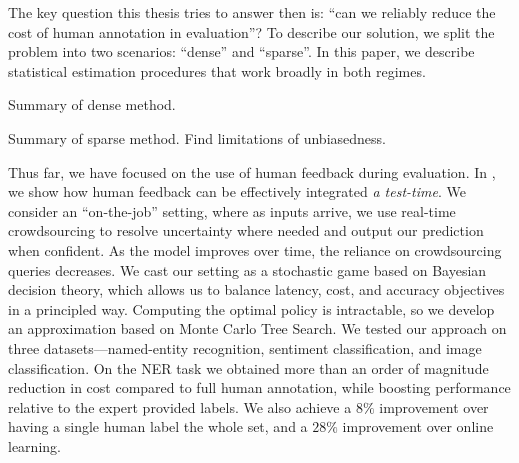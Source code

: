 The key question this thesis tries to answer then is: ``can we reliably reduce the cost of human annotation in evaluation''?
To describe our solution, we split the problem into two scenarios: ``dense'' and ``sparse''.
In this paper, we describe statistical estimation procedures that work broadly in both regimes.

Summary of dense method.

Summary of sparse method.
Find limitations of unbiasedness.

Thus far, we have focused on the use of human feedback during evaluation.
In , we show how human feedback can be effectively integrated \textit{a test-time}.
We consider an ``on-the-job'' setting, where as inputs arrive, we use real-time crowdsourcing to resolve uncertainty where needed and output our prediction when confident.
As the model improves over time, the reliance on crowdsourcing queries
decreases. 
We cast our setting as a stochastic game based on Bayesian decision
theory, which allows us to balance latency, cost, and accuracy objectives in a principled way. 
Computing the optimal policy is intractable, so we develop an approximation based on Monte Carlo Tree Search.
We tested our approach on three datasets---named-entity recognition, sentiment classification, and image classification.
On the NER task we obtained more than an order of magnitude reduction in cost compared to full human annotation, while boosting performance relative to the expert provided labels.
We also achieve a $8\%$ \fone{} improvement over having a single human label the whole set, and a $28\%$ \fone{} improvement over online learning.


% 
% 
% 




